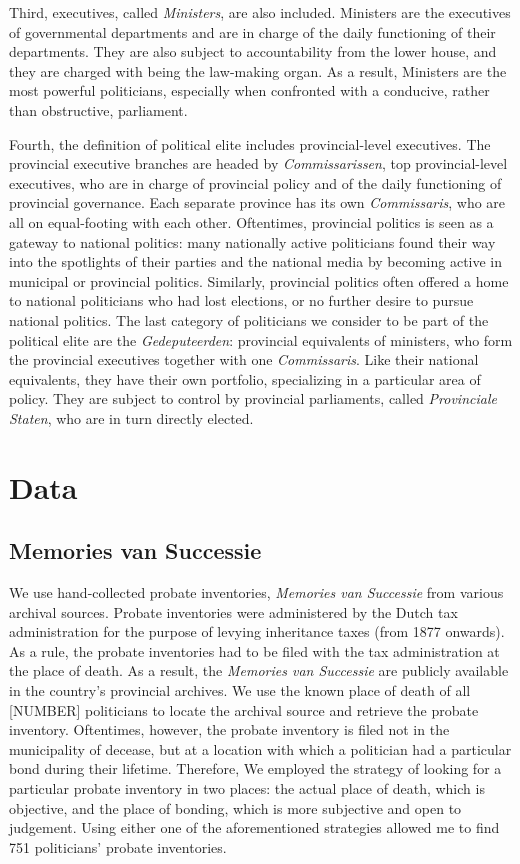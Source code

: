 Third, executives, called \textit{Ministers}, are also included. Ministers are the executives of governmental departments and are in charge of the daily functioning of their departments. They are also subject to accountability from the lower house, and they are charged with being the law-making organ. As a result, Ministers are the most powerful politicians, especially when confronted with a conducive, rather than obstructive, parliament. 

Fourth, the definition of political elite includes provincial-level executives. The provincial executive branches are headed by \textit{Commissarissen}, top provincial-level executives, who are in charge of provincial policy and of the daily functioning of provincial governance. Each separate province has its own \textit{Commissaris}, who are all on equal-footing with each other. Oftentimes, provincial politics is seen as a gateway to national politics: many nationally active politicians found their way into the spotlights of their parties and the national media by becoming active in municipal or provincial politics. Similarly, provincial politics often offered a home to national politicians who had lost elections, or no further desire to pursue national politics. The last category of politicians we consider to be part of the political elite are the \textit{Gedeputeerden}: provincial equivalents of ministers, who form the provincial executives together with one \textit{Commissaris}. Like their national equivalents, they have their own portfolio, specializing in a particular area of policy. They are subject to control by provincial parliaments, called \textit{Provinciale Staten}, who are in turn directly elected. 

\section{Data}
\subsection{Memories van Successie}
We use hand-collected probate inventories, \textit{Memories van Successie} from various archival sources. Probate inventories were administered by the Dutch tax administration for the purpose of levying inheritance taxes (from 1877 onwards). As a rule, the probate inventories had to be filed with the tax administration at the place of death. As a result, the \textit{Memories van Successie} are publicly available in the country's provincial archives. We use the known place of death of all [NUMBER] politicians to locate the archival source and retrieve the probate inventory. Oftentimes, however, the probate inventory is filed not in the municipality of decease, but at a location with which a politician had a particular bond during their lifetime. Therefore, We employed the strategy of looking for a particular probate inventory in two places: the actual place of death, which is objective, and the place of bonding, which is more subjective and open to judgement. Using either one of the aforementioned strategies allowed me to find 751 politicians' probate inventories. 

